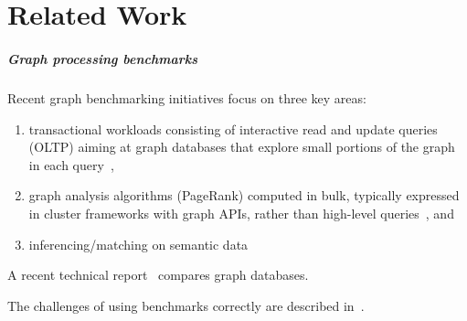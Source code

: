 \chapter{Related Work}
\label{section:related-work}


\paragraph*{Graph processing benchmarks}

Recent graph benchmarking initiatives focus on three key areas:

\begin{enumerate}
\item transactional workloads consisting of interactive read and update queries (OLTP) aiming at graph databases that explore small portions of the graph in each query~\cite{DBLP:conf/cidr/BarahmandG13,DBLP:conf/sigmod/ArmstrongPBC13,DBLP:journals/ase/DayarathnaS14,DBLP:conf/sigmod/ErlingALCGPPB15},
\item graph analysis algorithms (\eg PageRank) computed in bulk, typically expressed in cluster frameworks with graph APIs, rather than high-level queries~\cite{DBLP:conf/hipc/BaderM05,DBLP:conf/bigdataconf/ElserM13,DBLP:conf/sc/NaiXTKL15,DBLP:journals/pvldb/IosupHNHPMCCSAT16}, and
\item inferencing/matching on semantic data~\cite{DBLP:journals/ws/GuoPH05,DBLP:books/sp/virgilio09/SchmidtHMPL09,DBLP:conf/semweb/MorseyLAN11,DBLP:conf/semweb/AlucHOD14,TrainBenchmarkSOSYM}
\end{enumerate}

A recent technical report~\cite{lissandrini17} compares graph databases.

The challenges of using benchmarks correctly are described in~\cite{DBLP:conf/sigmod/RaasveldtHGM18}.





